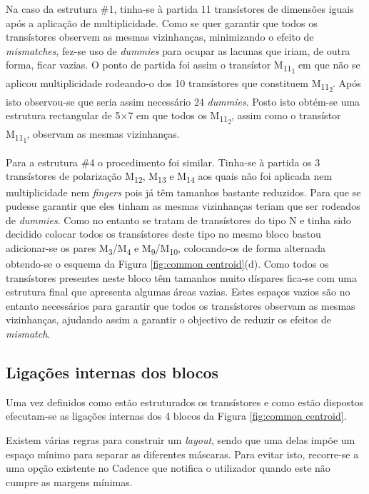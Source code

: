 \documentclass[11pt]{article}
\numberwithin{equation}{section}
\begin{document}
Na caso da estrutura \#1, tinha-se à partida 11 transístores de dimensões iguais após a aplicação de multiplicidade. Como se quer garantir que todos os transístores observem as mesmas vizinhanças, minimizando o efeito de \textit{mismatches}, fez-se uso de \textit{dummies} para ocupar as lacunas que iriam, de outra forma, ficar vazias. O ponto de partida foi assim o transístor M\textsubscript{11\textsubscript{1}} em que não se aplicou multiplicidade rodeando-o dos 10 transístores que constituem M\textsubscript{11\textsubscript{2}}. Após isto observou-se que seria assim necessário 24 \textit{dummies}. Posto isto obtém-se uma estrutura rectangular de 5$\times$7 em que todos os M\textsubscript{11\textsubscript{2}}, assim como o transístor M\textsubscript{11\textsubscript{1}}, observam as mesmas vizinhanças.
		
Para a estrutura \#4 o procedimento foi similar. Tinha-se à partida os 3 transístores de polarização M\textsubscript{12}, M\textsubscript{13} e M\textsubscript{14} aos quais não foi aplicada nem multiplicidade nem \textit{fingers} pois já têm tamanhos bastante reduzidos. Para que se pudesse garantir que eles tinham as mesmas vizinhanças teriam que ser rodeados de \textit{dummies}. Como no entanto se tratam de transístores do tipo N e tinha sido decidido colocar todos os transístores deste tipo no mesmo bloco bastou adicionar-se os pares  M\textsubscript{3}/M\textsubscript{4} e  M\textsubscript{9}/M\textsubscript{10}, colocando-os de forma alternada obtendo-se o esquema da Figura \ref{fig:common centroid}(d). Como todos os transístores presentes neste bloco têm tamanhos muito díspares fica-se com uma estrutura final que apresenta algumas áreas vazias. Estes espaços vazios são no entanto necessários para garantir que todos os transístores observam as mesmas vizinhanças, ajudando assim a garantir o objectivo de reduzir os efeitos de \textit{mismatch}.

\subsection{Ligações internas dos blocos}

Uma vez definidos como estão estruturados os transístores e como estão dispostos efecutam-se as ligações internas dos 4 blocos da Figura \ref{fig:common centroid}.

Existem várias regras para construir um \textit{layout}, sendo que uma delas impõe um espaço mínimo para separar as diferentes máscaras. Para evitar isto, recorre-se a uma opção existente no Cadence que notifica o utilizador quando este não cumpre as margens mínimas. 
\end{document}
